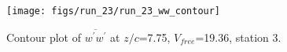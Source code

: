 \begin{figure}[H]
\centering
\texttt{[image: figs/run\_23/run\_23\_ww\_contour]}
\caption{Contour plot of $\overline{w^\prime w^\prime}$ at $z/c$=7.75, $V_{free}$=19.36, station 3.}
\label{fig:run_23_ww_contour}
\end{figure}


